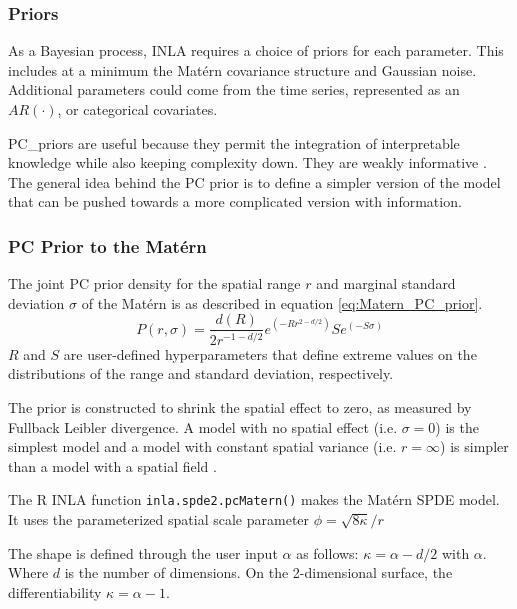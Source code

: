 \subsubsection*{Priors} \label{subsubsec:Priors}
As a Bayesian process, \ac{INLA} requires a choice of priors for each parameter.  This includes at a minimum the  Mat\'{e}rn covariance structure and Gaussian noise.  Additional parameters could come from the time series, represented as an $AR(\cdot)$, or categorical covariates.

\Gls{PC_priors} are useful because they permit the integration of interpretable knowledge while also keeping complexity down.  They are weakly informative  \citep{fuglstad2017constructing, simpson2017penalising}.
The general idea behind the PC prior is to define a simpler version of the model that can be pushed towards a more complicated version with information.   


\subsubsection*{PC Prior to the Mat\'{e}rn}
\label{subsubsec:pcprioronmatern}
The joint PC prior density for the spatial range $r$ and marginal standard deviation $\sigma$ of the Mat\'{e}rn is as described in equation \ref{eq:Matern_PC_prior}.
\begin{equation} \label{eq:Matern_PC_prior}
P(r, \sigma) = \frac{d(R)}{2 r^{-1-d/2}} e^{(-R r  ^{2 -d/2})} S e^{(-S \sigma)}
\end{equation}
$R$ and $S$ are user-defined hyperparameters that define extreme values on the distributions of the range and standard deviation, respectively.

The prior is constructed to shrink the spatial effect to zero, as measured by Fullback Leibler divergence.  A model with no spatial effect (i.e. $\sigma = 0$) is the simplest model and a model with constant spatial variance (i.e. $r = \infty$)  is simpler than a model with a spatial field \citep{fuglstad2017constructing}.

The R \ac{INLA} function \verb|inla.spde2.pcMatern()| makes the Mat\'{e}rn \ac{SPDE} model.  It uses the parameterized spatial scale parameter $\phi = \sqrt{8\kappa}/r$


The shape is defined through the user input $\alpha$ as follows:  $\kappa = \alpha -d/2$ with $\alpha$.  Where $d$ is the number of dimensions.  On the 2-dimensional surface, the differentiability $\kappa = \alpha -1$.



